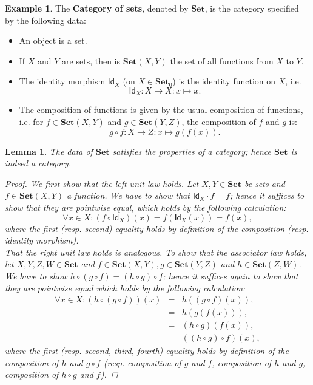 \documentclass[a4paper,11pt, oneside,titlepage=false]{scrbook}
\theoremstyle{plain}
\newtheorem{lemma}[thm]{Lemma}
\theoremstyle{definition}
\newtheorem{exa}[thm]{Example}
\newcommand{\cfont}[1]{\ensuremath{\mathsf{#1}}}
\newcommand{\Catb}[1]{\mathbf{#1}}
\newcommand{\SET}{\Catb{Set}}
\newcommand{\Ob}[1]{{#1}_0}
\newcommand{\CHom}[3]{{#1}(#2,#3)}
\newcommand{\Id}[1][]{\cfont{Id}_{#1}}
\newcommand{\Comp}{\cdot}
\begin{document}
\begin{exa}\label{example:set} The \textbf{Category of sets}, denoted by $\SET$, is the category specified by the following data:
\begin{itemize}
\item An object is a set.
\item If $X$ and $Y$ are sets, then is $\CHom \SET X Y$ the set of all functions from $X$ to $Y$.
\item The identity morphism $\Id[X]$ (on $X\in\Ob{\SET}$) is the identity function on $X$, i.e.
\[
\Id[X] : X\to X: x \mapsto x.
\]
\item The composition of functions is given by the usual composition of functions, i.e. for $f\in \CHom \SET X Y$ and $g\in \CHom \SET Y Z$, the composition of $f$ and $g$ is:
\[
g \circ f : X\to Z: x\mapsto g(f(x)).
\]
\end{itemize}
\end{exa}
\begin{lemma} The data of $\SET$ satisfies the properties of a category; hence $\SET$ is indeed a category.
\begin{proof}
We first show that the left unit law holds. Let $X,Y\in \mathbf{Set}$ be sets and $f\in \CHom \SET X Y$ a function. We have to show that $\Id[X] \Comp f = f$; hence it suffices to show that they are pointwise equal, which holds by the following calculation:
\[
\forall x\in X: (f\circ \Id[X])(x) = f\left(\Id[X](x)\right) = f(x),
\]
where the first (resp. second) equality holds by definition of the composition (resp. identity morphism).\\
That the right unit law holds is analogous. To show that the associator law holds, let $X,Y,Z,W\in\mathbf{Set}$ and $f\in \CHom \SET X Y, g\in \CHom \SET Y Z$ and $h\in \CHom \SET Z W$. We have to show $h\circ (g\circ f) = (h\circ g)\circ f$; hence it suffices again to show that they are pointwise equal which holds by the following calculation:
\begin{eqnarray*}
\forall x\in X: \left(h\circ (g\circ f)\right)(x) &=& h\left((g\circ f)(x)\right), \\ 
	&=& h(g(f(x))),\\ 
	&=& (h\circ g)(f(x)),\\ 
	&=& \left((h\circ g)\circ f\right)(x),
\end{eqnarray*}
where the first (resp. second, third, fourth) equality holds by definition of the composition of $h$ and $g\circ f$ (resp. composition of $g$ and $f$, composition of $h$ and $g$, composition of $h\circ g$ and $f$).
\end{proof}
\end{lemma}
\end{document}
